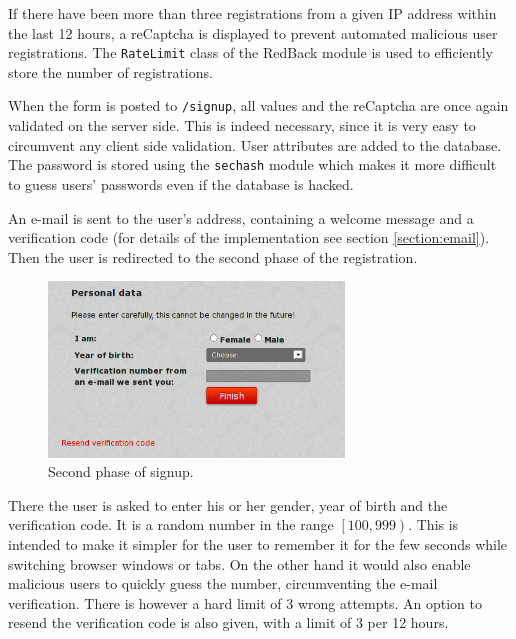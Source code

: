 \documentclass[12pt,oneside]{fithesis}
\begin{document}
		If there have been more than three registrations from a given IP address within the last 12 hours, a reCaptcha is displayed to prevent automated malicious user registrations. The \texttt{RateLimit} class of the RedBack module is used to efficiently store the number of registrations.
		
		When the form is posted to \texttt{/signup}, all values and the reCaptcha are once again validated on the server side. This is indeed necessary, since it is very easy to circumvent any client side validation. User attributes are added to the database. The password is stored using the \texttt{sechash} module which makes it more difficult to guess users' passwords even if the database is hacked.
		
		An e-mail is sent to the user's address, containing a welcome message and a verification code (for details of the implementation see section \ref{section:email}). Then the user is redirected to the second phase of the registration.
		
		\begin{figure}[h]
	  \centering
	    \includegraphics[width=0.7\textwidth]{screen-signup1.png}
		  \caption{Second phase of signup.}
		  \label{fig:screen-signup1}
	  \end{figure}
	  There the user is asked to enter his or her gender, year of birth and the verification code. It is a random number in the range $\left[ 100,999\right)$. This is intended to make it simpler for the user to remember it for the few seconds while switching browser windows or tabs. On the other hand it would also enable malicious users to quickly guess the number, circumventing the e-mail verification. There is however a hard limit of 3 wrong attempts. An option to resend the verification code is also given, with a limit of 3 per 12 hours.
	  
\end{document}
